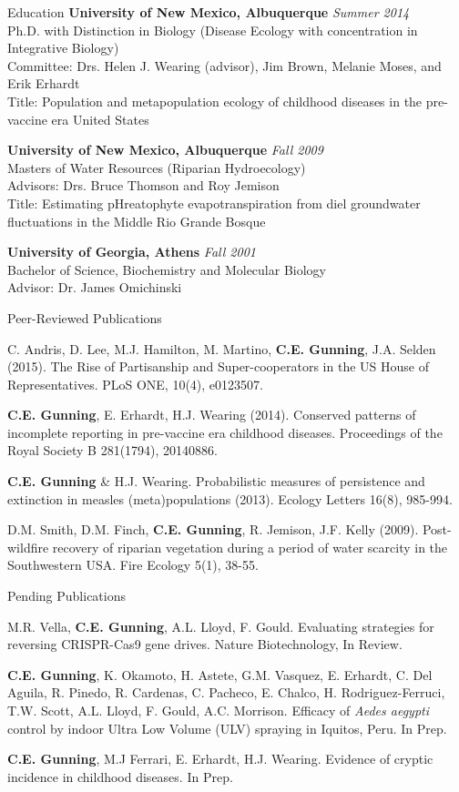 \documentclass{resume} %
\begin{document}
\begin{rSection}{Education}
{\bf University of New Mexico, Albuquerque} \hfill {\em Summer 2014} \\ 
Ph.D. with Distinction in Biology (Disease Ecology with concentration in
Integrative Biology) \\
Committee: Drs. Helen J. Wearing (advisor), Jim Brown, Melanie Moses, and Erik Erhardt\\
Title: Population and metapopulation ecology of childhood diseases in the pre-vaccine era United States

{\bf University of New Mexico, Albuquerque} \hfill {\em Fall 2009} \\ 
Masters of Water Resources (Riparian Hydroecology) \\
Advisors: Drs. Bruce Thomson and Roy Jemison \\
Title: Estimating pHreatophyte evapotranspiration from diel groundwater fluctuations in the Middle Rio Grande Bosque

{\bf University of Georgia, Athens} \hfill {\em Fall 2001} \\ 
Bachelor of Science, Biochemistry and Molecular Biology \\
Advisor: Dr. James Omichinski
\end{rSection}


\begin{rSection}{Peer-Reviewed Publications}

C. Andris, D. Lee, M.J.  Hamilton, M. Martino, {\bf C.E. Gunning},  J.A. Selden (2015).
The Rise of Partisanship and Super-cooperators in the US House of Representatives.
PLoS ONE, 10(4), e0123507.

{\bf C.E. Gunning}, E. Erhardt, H.J. Wearing (2014). 
Conserved patterns of incomplete reporting in pre-vaccine era childhood diseases.
Proceedings of the Royal Society B 281(1794), 20140886. 

{\bf C.E. Gunning} \& H.J. Wearing. Probabilistic measures of persistence
and extinction in measles (meta)populations (2013).  Ecology Letters 16(8), 985-994.

D.M. Smith, D.M. Finch, {\bf C.E. Gunning}, R. Jemison, J.F. Kelly (2009). Post-wildfire recovery of riparian vegetation during a period of water scarcity in the Southwestern USA. Fire Ecology 5(1), 38-55.
\end{rSection}

\begin{rSection}{Pending Publications}

M.R. Vella, {\bf C.E. Gunning}, A.L. Lloyd, F. Gould.
Evaluating strategies for reversing CRISPR-Cas9 gene drives.
Nature Biotechnology, In Review.

{\bf C.E. Gunning}, K. Okamoto, H. Astete, G.M. Vasquez, E. Erhardt, 
C. Del Aguila, R. Pinedo, R. Cardenas, C. Pacheco, E. Chalco, 
H. Rodriguez-Ferruci, T.W. Scott, A.L. Lloyd, F. Gould, A.C. Morrison.
Efficacy of {\em Aedes aegypti} control by indoor Ultra Low Volume (ULV) spraying 
in Iquitos, Peru. In Prep.

{\bf C.E. Gunning}, M.J Ferrari, E. Erhardt, H.J. Wearing.
Evidence of cryptic incidence in childhood diseases. In Prep.

\end{rSection}
\end{document}
